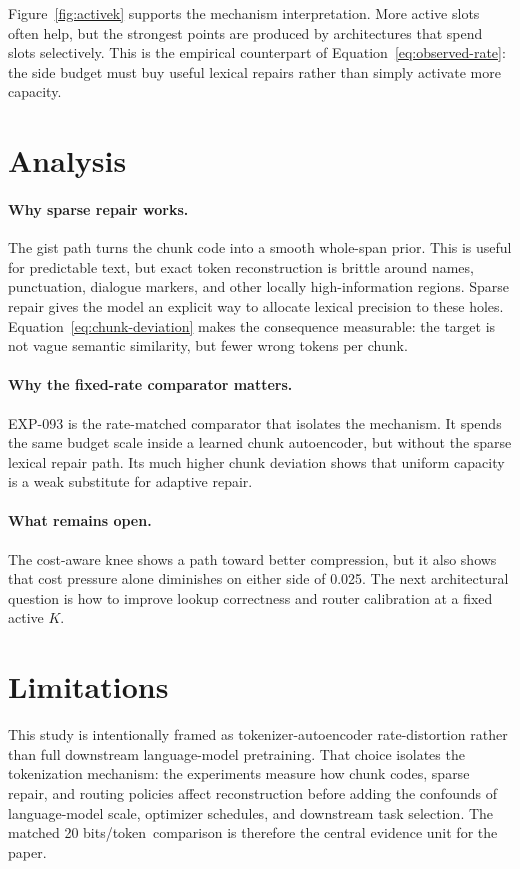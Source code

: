 \documentclass[11pt]{article}
\newcommand{\Exp}[1]{\textsc{EXP-#1}}
\newcommand{\bitsper}{bits/token}
\begin{document}
Figure~\ref{fig:activek} supports the mechanism interpretation. More active slots often help, but the strongest points are produced by architectures that spend slots selectively. This is the empirical counterpart of Equation~\ref{eq:observed-rate}: the side budget must buy useful lexical repairs rather than simply activate more capacity.

\section{Analysis}
\paragraph{Why sparse repair works.}
The gist path turns the chunk code into a smooth whole-span prior. This is useful for predictable text, but exact token reconstruction is brittle around names, punctuation, dialogue markers, and other locally high-information regions. Sparse repair gives the model an explicit way to allocate lexical precision to these holes. Equation~\ref{eq:chunk-deviation} makes the consequence measurable: the target is not vague semantic similarity, but fewer wrong tokens per chunk.

\paragraph{Why the fixed-rate comparator matters.}
\Exp{093} is the rate-matched comparator that isolates the mechanism. It spends the same budget scale inside a learned chunk autoencoder, but without the sparse lexical repair path. Its much higher chunk deviation shows that uniform capacity is a weak substitute for adaptive repair.

\paragraph{What remains open.}
The cost-aware knee shows a path toward better compression, but it also shows that cost pressure alone diminishes on either side of 0.025. The next architectural question is how to improve lookup correctness and router calibration at a fixed active $K$.

\section{Limitations}
This study is intentionally framed as tokenizer-autoencoder rate-distortion rather than full downstream language-model pretraining. That choice isolates the tokenization mechanism: the experiments measure how chunk codes, sparse repair, and routing policies affect reconstruction before adding the confounds of language-model scale, optimizer schedules, and downstream task selection. The matched 20 \bitsper\ comparison is therefore the central evidence unit for the paper.
\end{document}
